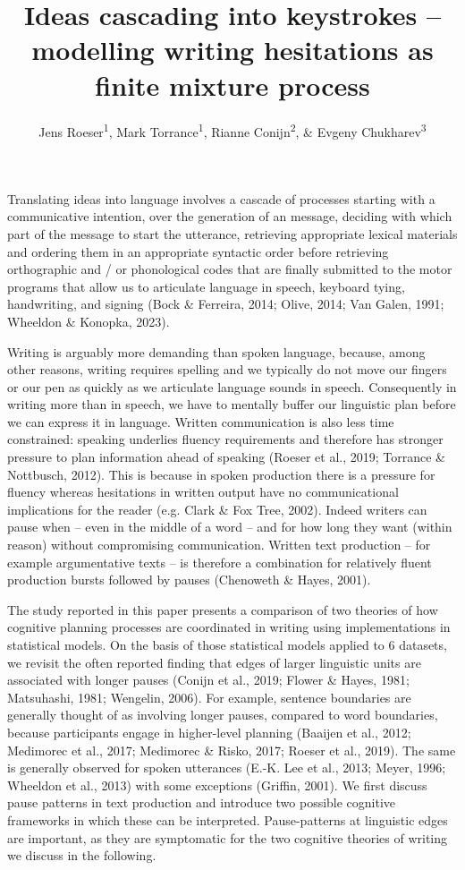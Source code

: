 \documentclass[
  english,
  man,floatsintext]{apa7}
\title{Ideas cascading into keystrokes -- modelling writing hesitations as finite mixture process}
\author{Jens Roeser\textsuperscript{1}, Mark Torrance\textsuperscript{1}, Rianne Conijn\textsuperscript{2}, \& Evgeny Chukharev\textsuperscript{3}}
\date{}
\affiliation{\vspace{0.5cm}\textsuperscript{1} Department of Psychology, Nottingham Trent University, United Kingdom\\\textsuperscript{2} Artificial Intelligence Systems Institute, Eindhoven University of Technology, The Netherlands\\\textsuperscript{3} Department of English, Iowa State University, Iowa}
\begin{document}
\maketitle

Translating ideas into language involves a cascade of processes starting with a communicative intention, over the generation of an message, deciding with which part of the message to start the utterance, retrieving appropriate lexical materials and ordering them in an appropriate syntactic order before retrieving orthographic and / or phonological codes that are finally submitted to the motor programs that allow us to articulate language in speech, keyboard tying, handwriting, and signing (Bock \& Ferreira, 2014; Olive, 2014; Van Galen, 1991; Wheeldon \& Konopka, 2023).

Writing is arguably more demanding than spoken language, because, among other reasons, writing requires spelling and we typically do not move our fingers or our pen as quickly as we articulate language sounds in speech. Consequently in writing more than in speech, we have to mentally buffer our linguistic plan before we can express it in language. Written communication is also less time constrained: speaking underlies fluency requirements and therefore has stronger pressure to plan information ahead of speaking (Roeser et al., 2019; Torrance \& Nottbusch, 2012). This is because in spoken production there is a pressure for fluency whereas hesitations in written output have no communicational implications for the reader (e.g. Clark \& Fox Tree, 2002). Indeed writers can pause when -- even in the middle of a word -- and for how long they want (within reason) without compromising communication. Written text production -- for example argumentative texts -- is therefore a combination for relatively fluent production bursts followed by pauses (Chenoweth \& Hayes, 2001).

The study reported in this paper presents a comparison of two theories of how cognitive planning processes are coordinated in writing using implementations in statistical models. On the basis of those statistical models applied to 6 datasets, we revisit the often reported finding that edges of larger linguistic units are associated with longer pauses (Conijn et al., 2019; Flower \& Hayes, 1981; Matsuhashi, 1981; Wengelin, 2006). For example, sentence boundaries are generally thought of as involving longer pauses, compared to word boundaries, because participants engage in higher-level planning (Baaijen et al., 2012; Medimorec et al., 2017; Medimorec \& Risko, 2017; Roeser et al., 2019). The same is generally observed for spoken utterances (E.-K. Lee et al., 2013; Meyer, 1996; Wheeldon et al., 2013) with some exceptions (Griffin, 2001). We first discuss pause patterns in text production and introduce two possible cognitive frameworks in which these can be interpreted. Pause-patterns at linguistic edges are important, as they are symptomatic for the two cognitive theories of writing we discuss in the following.
\end{document}
